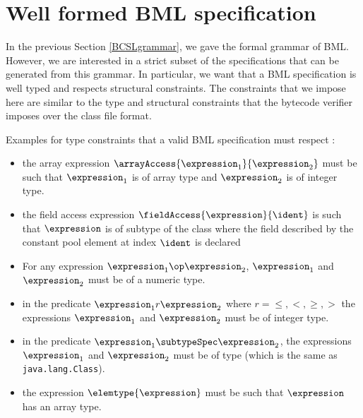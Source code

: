 
\newcommand{\getType}{\mbox{\rm\textsf{getType}}}
\newcommand{\constType}{\mbox{\rm\textsf{constType}}}
\newcommand{\getClass}{\mbox{\rm\textsf{getClass}}}
\newcommand{\application}{\mbox{\rm\textbf{CLS}}}
 
\section{Well formed BML specification}\label{BML:wf}
In the previous Section \ref{BCSLgrammar}, we gave the formal grammar of BML.
However, we are interested in a strict subset of 
the specifications that can be generated from this grammar. In particular, we want that a
BML specification is well typed and respects structural constraints.
The constraints that we impose here are similar to the type and structural constraints
that the bytecode verifier imposes over the class file format.

Examples for type constraints that  a valid BML specification must respect : 
\begin{itemize}
    \item  the array expression $\arrayAccess{\expression_1}{\expression_2}$ must be such that 
$\expression_1$ is of array type and $\expression_2$  is of integer type.

    \item the field access expression  $\fieldAccess{\expression}{\ident}$ is such that $\expression$ is of subtype
    of the class where the field described by the constant pool element at index $\ident$ is declared
    \item For any expression $ \expression_1 \op \expression_2$,  $ \expression_1$ and $ \expression_2$ must be of
          a numeric type.
    
    \item in the predicate $\expression_1 r \expression_2$ where $r =  \leq,<,\geq, >$  the expressions  $\expression_1$ and 
          $\expression_2$ must be of integer type.

     \item  in the predicate $\expression_1  \subtypeSpec \expression_2$, the expressions $\expression_1$
            and  $\expression_2$ must be of type \TYPE (which is the same as \texttt{java.lang.Class}).

     \item the expression $\elemtype{\expression}$ must be such that $\expression$ has an array type.
	    
     

	  
 \end{itemize}

